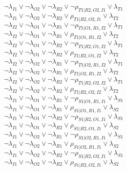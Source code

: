 $\neg\lambda_{I1} \vee \neg\lambda_{O2} \vee \neg\lambda_{R2} \vee \neg\rho_{T1|R2,O2,I1} \vee \lambda_{T1}$\\
$\neg\lambda_{I1} \vee \neg\lambda_{O2} \vee \neg\lambda_{R2} \vee \rho_{T1|R2,O2,I1} \vee \lambda_{T2}$\\
$\neg\lambda_{I2} \vee \neg\lambda_{O1} \vee \neg\lambda_{R1} \vee \neg\rho_{T1|O1,R1,I2} \vee \lambda_{T1}$\\
$\neg\lambda_{I2} \vee \neg\lambda_{O1} \vee \neg\lambda_{R1} \vee \rho_{T1|O1,R1,I2} \vee \lambda_{T2}$\\
$\neg\lambda_{I2} \vee \neg\lambda_{O1} \vee \neg\lambda_{R2} \vee \neg\rho_{T1|R2,O1,I2} \vee \lambda_{T1}$\\
$\neg\lambda_{I2} \vee \neg\lambda_{O1} \vee \neg\lambda_{R2} \vee \rho_{T1|R2,O1,I2} \vee \lambda_{T2}$\\
$\neg\lambda_{I2} \vee \neg\lambda_{O2} \vee \neg\lambda_{R1} \vee \neg\rho_{T1|O2,R1,I2} \vee \lambda_{T1}$\\
$\neg\lambda_{I2} \vee \neg\lambda_{O2} \vee \neg\lambda_{R1} \vee \rho_{T1|O2,R1,I2} \vee \lambda_{T2}$\\
$\neg\lambda_{I2} \vee \neg\lambda_{O2} \vee \neg\lambda_{R2} \vee \neg\rho_{T1|R2,O2,I2} \vee \lambda_{T1}$\\
$\neg\lambda_{I2} \vee \neg\lambda_{O2} \vee \neg\lambda_{R2} \vee \rho_{T1|R2,O2,I2} \vee \lambda_{T2}$\\
$\neg\lambda_{I1} \vee \neg\lambda_{O1} \vee \neg\lambda_{R1} \vee \neg\rho_{S1|O1,R1,I1} \vee \lambda_{S1}$\\
$\neg\lambda_{I1} \vee \neg\lambda_{O1} \vee \neg\lambda_{R1} \vee \rho_{S1|O1,R1,I1} \vee \lambda_{S2}$\\
$\neg\lambda_{I1} \vee \neg\lambda_{O1} \vee \neg\lambda_{R2} \vee \neg\rho_{S1|R2,O1,I1} \vee \lambda_{S1}$\\
$\neg\lambda_{I1} \vee \neg\lambda_{O1} \vee \neg\lambda_{R2} \vee \rho_{S1|R2,O1,I1} \vee \lambda_{S2}$\\
$\neg\lambda_{I1} \vee \neg\lambda_{O2} \vee \neg\lambda_{R1} \vee \neg\rho_{S1|O2,R1,I1} \vee \lambda_{S1}$\\
$\neg\lambda_{I1} \vee \neg\lambda_{O2} \vee \neg\lambda_{R1} \vee \rho_{S1|O2,R1,I1} \vee \lambda_{S2}$\\
$\neg\lambda_{I1} \vee \neg\lambda_{O2} \vee \neg\lambda_{R2} \vee \neg\rho_{S1|R2,O2,I1} \vee \lambda_{S1}$\\
$\neg\lambda_{I1} \vee \neg\lambda_{O2} \vee \neg\lambda_{R2} \vee \rho_{S1|R2,O2,I1} \vee \lambda_{S2}$\\
